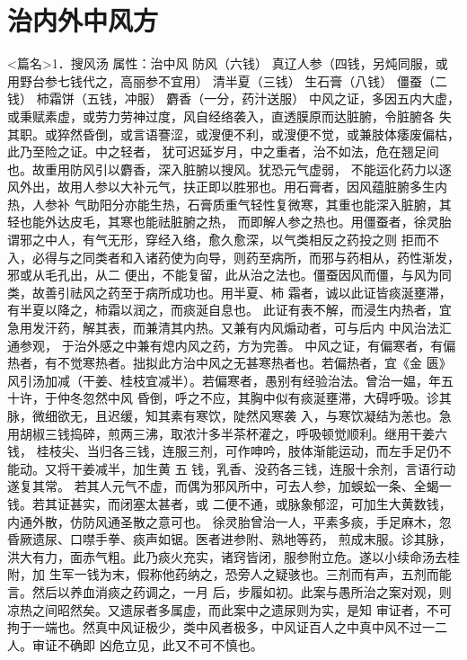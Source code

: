 \documentclass[a4paper,12pt,UTF8,twoside]{ctexbook}
\begin{document}
\chapter{治内外中风方}
<篇名>1．搜风汤
属性：治中风 
防风（六钱） 真辽人参（四钱，另炖同服，或用野台参七钱代之，高丽参不宜用） 清半夏（三钱） 
生石膏（八钱） 僵蚕（二钱） 柿霜饼（五钱，冲服） 麝香（一分，药汁送服） 
中风之证，多因五内大虚，或秉赋素虚，或劳力劳神过度，风自经络袭入，直透膜原而达脏腑，令脏腑各 
失其职。或猝然昏倒，或言语謇涩，或溲便不利，或溲便不觉，或兼肢体痿废偏枯，此乃至险之证。中之轻者， 
犹可迟延岁月，中之重者，治不如法，危在翘足间也。故重用防风引以麝香，深入脏腑以搜风。犹恐元气虚弱， 
不能运化药力以逐风外出，故用人参以大补元气，扶正即以胜邪也。用石膏者，因风蕴脏腑多生内热，人参补 
气助阳分亦能生热，石膏质重气轻性复微寒，其重也能深入脏腑，其轻也能外达皮毛，其寒也能祛脏腑之热， 
而即解人参之热也。用僵蚕者，徐灵胎谓邪之中人，有气无形，穿经入络，愈久愈深，以气类相反之药投之则 
拒而不入，必得与之同类者和入诸药使为向导，则药至病所，而邪与药相从，药性渐发，邪或从毛孔出，从二 
便出，不能复留，此从治之法也。僵蚕因风而僵，与风为同类，故善引祛风之药至于病所成功也。用半夏、柿 
霜者，诚以此证皆痰涎壅滞，有半夏以降之，柿霜以润之，而痰涎自息也。 
此证有表不解，而浸生内热者，宜急用发汗药，解其表，而兼清其内热。又兼有内风煽动者，可与后内 
中风治法汇通参观， 
于治外感之中兼有熄内风之药，方为完善。 
中风之证，有偏寒者，有偏热者，有不觉寒热者。拙拟此方治中风之无甚寒热者也。若偏热者，宜《金 
匮》风引汤加减（干姜、桂枝宜减半）。若偏寒者，愚别有经验治法。曾治一媪，年五十许，于仲冬忽然中风 
昏倒，呼之不应，其胸中似有痰涎壅滞，大碍呼吸。诊其脉，微细欲无，且迟缓，知其素有寒饮，陡然风寒袭 
入，与寒饮凝结为恙也。急用胡椒三钱捣碎，煎两三沸，取浓汁多半茶杯灌之，呼吸顿觉顺利。继用干姜六钱， 
桂枝尖、当归各三钱，连服三剂，可作呻吟，肢体渐能运动，而左手足仍不能动。又将干姜减半，加生黄 五 
钱，乳香、没药各三钱，连服十余剂，言语行动遂复其常。 
若其人元气不虚，而偶为邪风所中，可去人参，加蜈蚣一条、全蝎一钱。若其证甚实，而闭塞太甚者，或 
二便不通，或脉象郁涩，可加生大黄数钱，内通外散，仿防风通圣散之意可也。 
徐灵胎曾治一人，平素多痰，手足麻木，忽昏厥遗尿、口噤手拳、痰声如锯。医者进参附、熟地等药， 
煎成末服。诊其脉，洪大有力，面赤气粗。此乃痰火充实，诸窍皆闭，服参附立危。遂以小续命汤去桂附，加 
生军一钱为末，假称他药纳之，恐旁人之疑骇也。三剂而有声，五剂而能言。然后以养血消痰之药调之，一月 
后，步履如初。此案与愚所治之案对观，则凉热之间昭然矣。又遗尿者多属虚，而此案中之遗尿则为实，是知 
审证者，不可拘于一端也。然真中风证极少，类中风者极多，中风证百人之中真中风不过一二人。审证不确即 
凶危立见，此又不可不慎也。 
\end{document}
